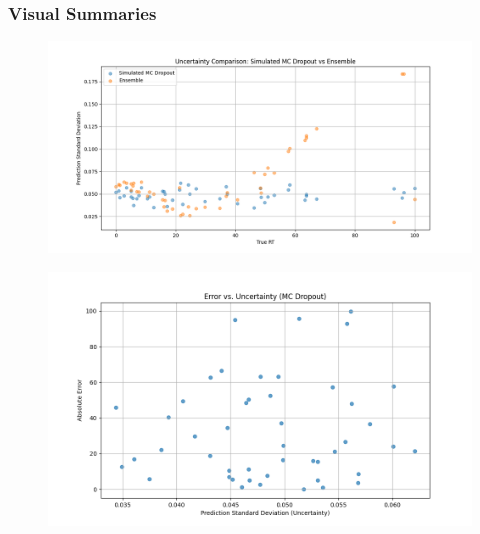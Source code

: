 \documentclass[10pt]{article}
\begin{document}
\subsubsection*{Visual Summaries}
\begin{figure}[htbp]
\centering
\begin{minipage}[b]{0.4\textwidth}
    \centering
    \includegraphics[width=\textwidth]{uncertainty_comparison.png}
    \label{fig:uncertainty_comparison}
\end{minipage}\hfill
\begin{minipage}[b]{0.4\textwidth}
    \centering
    \includegraphics[width=\textwidth]{mc_dropout_error_vs_uncertainty.png}
    \label{fig:mc_dropout_error}
\end{minipage}


\end{figure}
\end{document}
